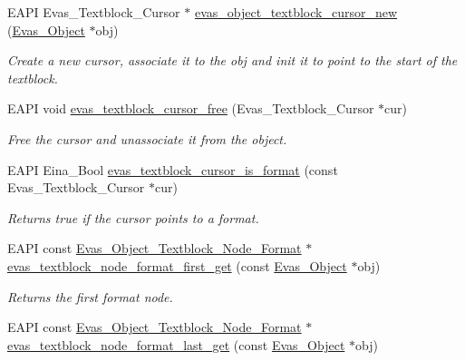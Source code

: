 \begin{DoxyCompactItemize}
EAPI Evas\_\-Textblock\_\-Cursor $\ast$ \hyperlink{group__Evas__Object__Textblock_ga6f6242cc087a6cc65196b09e813e2c45}{evas\_\-object\_\-textblock\_\-cursor\_\-new} (\hyperlink{group__Evas__Object__Group_ga9e19e6dd1f517a0ba437c0114d3e7c97}{Evas\_\-Object} $\ast$obj)
\begin{DoxyCompactList}\small\item\em Create a new cursor, associate it to the obj and init it to point to the start of the textblock. \item\end{DoxyCompactList}\item 
EAPI void \hyperlink{group__Evas__Object__Textblock_gaec3e250258e2f587381bcd1539469137}{evas\_\-textblock\_\-cursor\_\-free} (Evas\_\-Textblock\_\-Cursor $\ast$cur)
\begin{DoxyCompactList}\small\item\em Free the cursor and unassociate it from the object. \item\end{DoxyCompactList}\item 
EAPI Eina\_\-Bool \hyperlink{group__Evas__Object__Textblock_gaf389372f80b4cd3f2fc1fd8b99637367}{evas\_\-textblock\_\-cursor\_\-is\_\-format} (const Evas\_\-Textblock\_\-Cursor $\ast$cur)
\begin{DoxyCompactList}\small\item\em Returns true if the cursor points to a format. \item\end{DoxyCompactList}\item 
EAPI const \hyperlink{Evas_8h_adcd2409468741c89d607f06e17da1f64}{Evas\_\-Object\_\-Textblock\_\-Node\_\-Format} $\ast$ \hyperlink{group__Evas__Object__Textblock_ga56e9057e5845fe785710ba6c5d07ab3e}{evas\_\-textblock\_\-node\_\-format\_\-first\_\-get} (const \hyperlink{group__Evas__Object__Group_ga9e19e6dd1f517a0ba437c0114d3e7c97}{Evas\_\-Object} $\ast$obj)
\begin{DoxyCompactList}\small\item\em Returns the first format node. \item\end{DoxyCompactList}\item 
EAPI const \hyperlink{Evas_8h_adcd2409468741c89d607f06e17da1f64}{Evas\_\-Object\_\-Textblock\_\-Node\_\-Format} $\ast$ \hyperlink{group__Evas__Object__Textblock_ga091521044b95190c75c57ca1661bcc83}{evas\_\-textblock\_\-node\_\-format\_\-last\_\-get} (const \hyperlink{group__Evas__Object__Group_ga9e19e6dd1f517a0ba437c0114d3e7c97}{Evas\_\-Object} $\ast$obj)

\end{DoxyCompactItemize}
